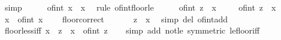 \begin{isabellebody}
\ simp\isanewline
\ \ \isamarkupfalse%
\ \isamarkupfalse%
\ {\isachardoublequoteopen}of{\isacharunderscore}{\kern0pt}int\ {\isasymlfloor}x{\isasymrfloor}\ {\isasymle}\ x{\isachardoublequoteclose}\ \isamarkupfalse%
\ {\isacharparenleft}{\kern0pt}rule\ of{\isacharunderscore}{\kern0pt}int{\isacharunderscore}{\kern0pt}floor{\isacharunderscore}{\kern0pt}le{\isacharparenright}{\kern0pt}\isanewline
\ \ \isamarkupfalse%
\ \isamarkupfalse%
\ {\isachardoublequoteopen}of{\isacharunderscore}{\kern0pt}int\ z\ {\isasymle}\ x{\isachardoublequoteclose}\ \isacommand{{\isachardot}{\kern0pt}}\isamarkupfalse%
\isanewline
{}\isamarkupfalse%
\isanewline
\ \ \isamarkupfalse%
\ {\isachardoublequoteopen}of{\isacharunderscore}{\kern0pt}int\ z\ {\isasymle}\ x{\isachardoublequoteclose}\isanewline
\ \ \isamarkupfalse%
\ \isamarkupfalse%
\ {\isachardoublequoteopen}x\ {\isacharless}{\kern0pt}\ of{\isacharunderscore}{\kern0pt}int\ {\isacharparenleft}{\kern0pt}{\isasymlfloor}x{\isasymrfloor}\ {\isacharplus}{\kern0pt}\ {}{\isacharparenright}{\kern0pt}{\isachardoublequoteclose}\ \isamarkupfalse%
\ floor{\isacharunderscore}{\kern0pt}correct\ \isacommand{{\isachardot}{\kern0pt}{\isachardot}{\kern0pt}}\isamarkupfalse%
\isanewline
\ \ \isamarkupfalse%
\ \isamarkupfalse%
\ {\isachardoublequoteopen}z\ {\isasymle}\ {\isasymlfloor}x{\isasymrfloor}{\isachardoublequoteclose}\ \isamarkupfalse%
\ {\isacharparenleft}{\kern0pt}simp\ del{\isacharcolon}{\kern0pt}\ of{\isacharunderscore}{\kern0pt}int{\isacharunderscore}{\kern0pt}add{\isacharparenright}{\kern0pt}\isanewline
{}\isamarkupfalse%
%
\endisatagproof
{\isafoldproof}%
%
\isadelimproof
\isanewline
%
\endisadelimproof
\isanewline
{}\isamarkupfalse%
\ floor{\isacharunderscore}{\kern0pt}less{\isacharunderscore}{\kern0pt}iff{\isacharcolon}{\kern0pt}\ {\isachardoublequoteopen}{\isasymlfloor}x{\isasymrfloor}\ {\isacharless}{\kern0pt}\ z\ {\isasymlongleftrightarrow}\ x\ {\isacharless}{\kern0pt}\ of{\isacharunderscore}{\kern0pt}int\ z{\isachardoublequoteclose}\isanewline
%
\isadelimproof
\ \ %
\endisadelimproof
%
\isatagproof
{}\isamarkupfalse%
\ {\isacharparenleft}{\kern0pt}simp\ add{\isacharcolon}{\kern0pt}\ not{\isacharunderscore}{\kern0pt}le\ {\isacharbrackleft}{\kern0pt}symmetric{\isacharbrackright}{\kern0pt}\ le{\isacharunderscore}{\kern0pt}floor{\isacharunderscore}{\kern0pt}iff{\isacharparenright}{\kern0pt}%

\end{isabellebody}
